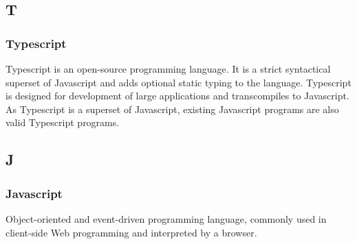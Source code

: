 	
	\subsection{T}
		\subsubsection*{Typescript}
			Typescript is an open-source programming language. It is a strict syntactical superset of Javascript and adds optional static typing to the language. Typescript is designed for development of large applications and transcompiles to Javascript. As Typescript is a superset of Javascript, existing Javascript programs are also valid Typescript programs.
			
	
	\subsection{J}
		\subsubsection*{Javascript}
			Object-oriented and event-driven programming language, commonly used in client-side Web programming and interpreted by a browser.